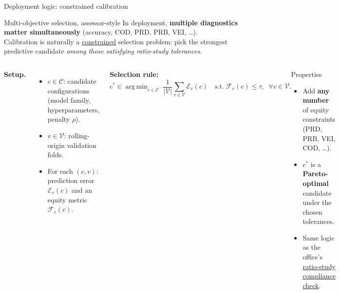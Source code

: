 \documentclass[aspectratio=169,12pt,]{beamer}
\newcommand{\argmin}{\mathop{\mathrm{arg\,min}}}
\newcommand{\1}{\mathbf{1}}
\newcommand{\V}{\mathcal{V}}
\newcommand{\C}{\mathcal{C}}
\begin{document}
\begin{frame}{Deployment logic: constrained calibration}

\begin{block}{ Multi-objective selection, assessor-style}
In deployment, \textbf{multiple diagnostics matter simultaneously} (accuracy, COD, PRD, PRB, VEI, \dots).\\
Calibration is naturally a \underline{constrained} selection problem: pick the strongest predictive candidate \emph{among those satisfying ratio-study tolerances}.
\end{block}

\vspace{-1mm}

\renewcommand{\C}{\mathcal{C}}
\renewcommand{\V}{\mathcal{V}}

\begin{columns}[T,onlytextwidth]

\textbf{Setup.}
\begin{itemize}
    \item $c \in \C$: candidate configurations (model family, hyperparameters, penalty $\rho$).
    \item $v \in \V$: rolling-origin validation folds.
    \item For each $(c,v)$: prediction error $\mathcal{E}_v(c)$ and an equity metric $\mathcal{F}_v(c)$.
\end{itemize}

\medskip

\textbf{Selection rule:}
\vspace{-1mm}
\[
c^* \in \argmin_{c \in \C}\; \frac{1}{|\V|}\sum_{v\in\V} \mathcal{E}_v(c)
\quad
\text{s.t.}\; \mathcal{F}_v(c) \le \tau,\;\; \forall v\in\V.
\]

\begin{block}{ Properties}
\begin{itemize}
    \item Add \textbf{any number} of equity constraints (PRD, PRB, VEI, COD, \dots).
    \item $c^*$ is a \textbf{Pareto-optimal} candidate under the chosen tolerances.
    \item Same logic as the office's \underline{ratio-study compliance check}.
\end{itemize}
\end{block}
\end{columns}

\end{frame}
\end{document}
